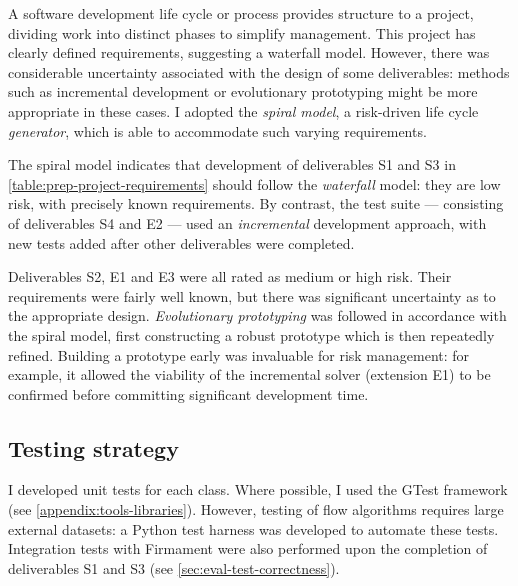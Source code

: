 


A software development life cycle or process provides structure to a project, dividing work into distinct phases to simplify management. This project has clearly defined requirements, suggesting a waterfall model. However, there was considerable uncertainty associated with the design of some deliverables: methods such as incremental development or evolutionary prototyping might be more appropriate in these cases. I adopted the \emph{spiral model}, a risk-driven life cycle \emph{generator}, which is able to accommodate such varying requirements.

The spiral model indicates that development of deliverables S1 and S3 in \cref{table:prep-project-requirements} should follow the \emph{waterfall} model: they are low risk, with precisely known requirements. By contrast, the test suite --- consisting of deliverables S4 and E2 --- used an \emph{incremental} development approach, with new tests added after other deliverables were completed.

Deliverables S2, E1 and E3 were all rated as medium or high risk. Their requirements were fairly well known, but there was significant uncertainty as to the appropriate design. \emph{Evolutionary prototyping} was followed in accordance with the spiral model, first constructing a robust prototype which is then repeatedly refined. Building a prototype early was invaluable for risk management: for example, it allowed the viability of the incremental solver (extension E1) to be confirmed before committing significant development time.


\subsection{Testing strategy}
\label{sec:prep-management-testing}
I developed unit tests for each class. Where possible, I used the GTest framework (see \cref{appendix:tools-libraries}). However, testing of flow algorithms requires large external datasets: a Python test harness was developed to automate these tests. Integration tests with Firmament were also performed upon the completion of deliverables S1 and S3 (see \cref{sec:eval-test-correctness}).

